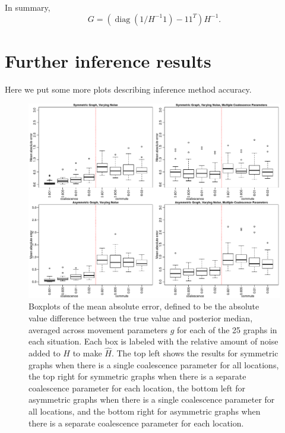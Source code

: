 \documentclass{article}
\DeclareMathOperator{\diag}{\mathop{\mbox{diag}}}
\begin{document}
In summary,
$$
    G = (\diag(1/H^{-1} 1) - 1 1^T) H^{-1} .
$$


\section{Further inference results}

Here we put some more plots describing inference method accuracy.


\begin{figure}
\centering
\includegraphics[scale=.6]{figs/mult_noise}
\caption{Boxplots of the mean absolute error, %
defined to be the absolute value difference between the true value and posterior median,
averaged across movement parameters $g$ for each of the 25 graphs in each situation.
Each box is labeled with the relative amount of noise added to $H$ to make $\hat{H}$.
The top left shows the results for symmetric graphs 
when there is a single coalescence parameter for all locations,
the top right for symmetric graphs 
when there is a separate coalescence parameter for each location,
the bottom left for asymmetric graphs 
when there is a single coalescence parameter for all locations,
and the bottom right for asymmetric graphs 
when there is a separate coalescence parameter for each location.}
\label{fig:mult_noise}
\end{figure}
\end{document}

